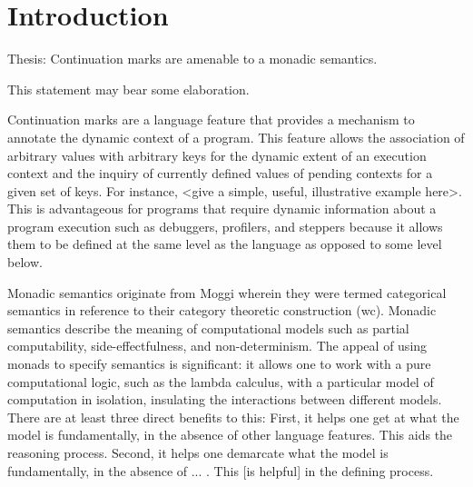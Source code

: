 \documentclass[ms]{byuprop}
\title{\Title}
\author{\Author}
\begin{document}
\maketitle



\section{Introduction}


Thesis: Continuation marks are amenable to a monadic semantics.

This statement may bear some elaboration. 

Continuation marks \cite{clements2006portable} are a language feature that provides a mechanism to annotate the dynamic context of a program. This feature allows the association of arbitrary values with arbitrary keys for the dynamic extent of an execution context and the inquiry of currently defined values of pending contexts for a given set of keys.
For instance, <give a simple, useful, illustrative example here>.
This is advantageous for programs that require dynamic information about a program execution such as debuggers, profilers, and steppers because it allows them to be defined at the same level as the language as opposed to some level below.

Monadic semantics originate from Moggi \cite{moggi1989computational} wherein they were termed categorical semantics in reference to their category theoretic construction (wc). Monadic semantics describe the meaning of computational models such as partial computability, side-effectfulness, and non-determinism. The appeal of using monads to specify semantics is significant: it allows one to work with a pure computational logic, such as the lambda calculus, with a particular model of computation in isolation, insulating the interactions between different models. There are at least three direct benefits to this: First, it helps one get at what the model is fundamentally, in the absence of other language features. This aids the reasoning process. Second, it helps one demarcate what the model is fundamentally, in the absence of ... . This [is helpful] in the defining process.
\end{document}
